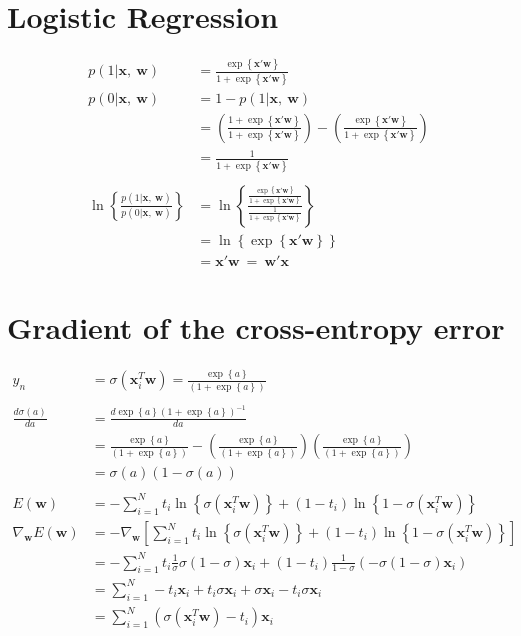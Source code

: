 \documentclass{article}
\newcommand{\diff}[2]{
        \frac{d #1}{d #2}
}
\begin{document}
\section{Logistic Regression}
\begin{align*}
p(1|\bm{x},~\bm{w}) &= \frac{ \exp\left\{ \bm{x}'\bm{w} \right\} }{ 1+\exp\left\{ \bm{x}'\bm{w} \right\} }\\
p(0|\bm{x},~\bm{w}) &= 1-p(1|\bm{x},~\bm{w})\\
		    &= \left(\frac{1+ \exp\left\{ \bm{x}'\bm{w} \right\} }{ 1+\exp\left\{ \bm{x}'\bm{w} \right\} }\right)-\left(\frac{ \exp\left\{ \bm{x}'\bm{w} \right\} }{ 1+\exp\left\{ \bm{x}'\bm{w} \right\} }\right)\\
		    &= \frac{ 1 }{ 1+\exp\left\{ \bm{x}'\bm{w} \right\} }\\
		    &\nonumber\\
\ln\left\{ \frac{p(1|\bm{x},~\bm{w})}{p(0|\bm{x},~\bm{w})} \right\} &= \ln \left\{ 
	\frac{ \frac{ \exp\left\{ \bm{x}'\bm{w} \right\} }{ 1+\exp\left\{ \bm{x}'\bm{w} \right\} } }
	     { \frac{ 1 }{ 1+\exp\left\{ \bm{x}'\bm{w} \right\} } } 
	\right\}\\
		    &= \ln\left\{ \exp\left\{ \bm{x}'\bm{w} \right\} \right\}\\
		    &= \bm{x}'\bm{w}~=~\bm{w}'\bm{x}
\end{align*}

\section{Gradient of the cross-entropy error}
\begin{align*}
y_n &= \sigma(\bm{x}_{i}^{T}\bm{w})=\frac{\exp\left\{ a \right\}}{\left( 1+\exp\left\{ a\right\} \right)}\\
&\nonumber\\
\diff{\sigma(a)}{a} &= \diff{\exp\left\{ a \right\} \left( 1+\exp\left\{ a\right\} \right)^{-1}}{a}\\
		    &= \frac{\exp\left\{ a \right\}}{\left( 1+\exp\left\{ a\right\} \right)} -
		       \left( 
			\frac{\exp\left\{ a \right\}}{\left( 1+\exp\left\{ a\right\} \right)}
		       \right)
		       \left(
			\frac{\exp\left\{ a \right\}}{\left( 1+\exp\left\{ a\right\} \right)}
		       \right)\\
		    &= \sigma(a)\left(1-\sigma(a)\right)\\
&\nonumber\\
E(\bm{w}) &= -\sum_{i=1}^N t_i \ln\left\{ \sigma(\bm{x}_{i}^{T} \bm{w}) \right\} + (1-t_i)\ln\left\{1-\sigma(\bm{x}_{i}^{T}\bm{w})\right\}\\
\nabla_{\bm{w}} E(\bm{w}) &= -\nabla_{\bm{w}}\left[\sum_{i=1}^N t_i \ln\left\{ \sigma(\bm{x}_{i}^{T}\bm{w}) \right\} + (1-t_i)\ln\left\{1-\sigma(\bm{x}_{i}^{T}\bm{w})\right\}\right]\\
&=-\sum_{i=1}^N t_i \frac{1}{\sigma} \sigma(1-\sigma)\bm{x}_{i} + (1-t_i) \frac{1}{1-\sigma} \left(-\sigma(1-\sigma)\bm{x}_{i}\right)\\
&=\sum_{i=1}^{N} -t_i \bm{x}_{i} + t_i \sigma \bm{x}_{i} + \sigma \bm{x}_{i} - t_i \sigma \bm{x}_{i}\\
&=\sum_{i=1}^{N} (\sigma(\bm{x}_{i}^{T}\bm{w}) - t_i)\bm{x}_{i}
\end{align*}
\end{document}
